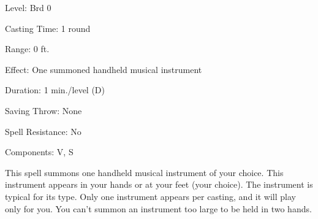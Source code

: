 
\begin{description*}
\item[Level:] Brd 0
\item[Casting Time:] 1 round
\item[Range:] 0 ft.
\item[Effect:] One summoned handheld musical instrument
\item[Duration:] 1 min./level (D)
\item[Saving Throw:] None
\item[Spell Resistance:] No
\item[Components:] V, S
\end{description*}

This spell summons one handheld musical instrument of your choice. This instrument
appears in your hands or at your feet (your choice). The instrument is typical
for its type. Only one instrument appears per casting, and it will play only for
you. You can't summon an instrument too large to be held in two hands.